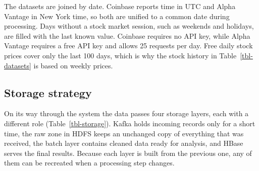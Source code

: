 \documentclass[
]{article}
\begin{document}
The datasets are joined by date. Coinbase reports time in UTC and Alpha Vantage in New York time, so both are unified to a common date during processing. Days without a stock market session, such as weekends and holidays, are filled with the last known value. Coinbase requires no API key, while Alpha Vantage requires a free API key and allows 25 requests per day. Free daily stock prices cover only the last 100 days, which is why the stock history in Table~\ref{tbl-datasets} is based on weekly prices.

\subsection{Storage strategy}\label{storage-strategy}

On its way through the system the data passes four storage layers, each with a different role (Table~\ref{tbl-storage}). Kafka holds incoming records only for a short time, the raw zone in HDFS keeps an unchanged copy of everything that was received, the batch layer contains cleaned data ready for analysis, and HBase serves the final results. Because each layer is built from the previous one, any of them can be recreated when a processing step changes.
\end{document}

